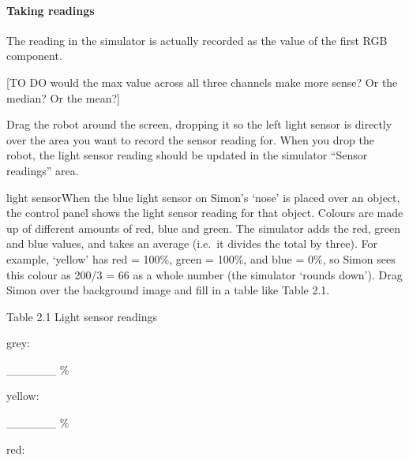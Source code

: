 \documentclass[letterpaper,10pt,english]{sphinxmanual}
\begin{document}
{\paragraph{Taking readings}
\label{\detokenize{content/04_Robot_Lab/Section_00_02:Taking-readings}}
The  reading in the simulator is actually recorded as the value of the first RGB component.

{[}TO DO \sphinxhyphen{} would the max value across all three channels make more sense? Or the median? Or the mean?{]}

Drag the robot around the screen, dropping it so the left light sensor is directly over the area you want to record the sensor reading for. When you drop the robot, the light sensor reading should be updated in the simulator “Sensor readings” area.

light sensorWhen the blue light sensor on Simon’s ‘nose’ is placed over an object, the control panel shows the light sensor reading for that object. Colours are made up of different amounts of red, blue and green. The simulator adds the red, green and blue values, and takes an average (i.e. it divides the total by three). For example, ‘yellow’ has red = 100\%, green = 100\%, and blue = 0\%, so Simon sees this colour as 200/3 = 66 as a whole number (the simulator ‘rounds down’). Drag Simon over the
background image and fill in a table like Table 2.1.





Table 2.1 Light sensor readings









grey:





\_\_\_\_\_\_ \%









yellow:





\_\_\_\_\_\_ \%









red:





}
\end{document}
